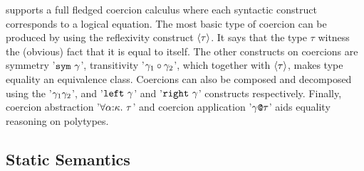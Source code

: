 \documentclass[manuscript,screen,nonacm]{acmart}
\begin{document}
\SFC supports a full fledged coercion calculus where each syntactic construct corresponds to a logical equation. The most basic type of coercion can be produced by using the reflexivity construct $\langle\tau\rangle$. It says that the type $\tau$ witness the (obvious) fact that it is equal to itself. The other constructs on coercions are symmetry '$\texttt{sym}~{\gamma}$', transitivity '$\gamma_1 \circ \gamma_2$', which together with $\langle\tau\rangle$, makes type equality an equivalence class. Coercions can also be composed and decomposed using the '$\gamma_1\gamma_2$', and '$\texttt{left}~\gamma$' and '$\texttt{right}~\gamma$' constructs respectively. Finally, coercion abstraction '$\forall\alpha{:}\kappa.~\tau$' and coercion application '$\gamma\texttt{@}\tau$' aids equality reasoning on polytypes.

\subsection{Static Semantics}

\newcommand\TCast{
  \ib{\irule[\trule{cast}]
    {\Typing \TEnv {\Tm} {\tau}}
    {\CoKinding \TEnv \gamma {\tau \sim \sigma}};
    {\Typing \TEnv {\Cast \Tm \gamma} {\sigma}}
  }
}

\newcommand\KReflCo{
  \ib{\irule[\trule{co-refl}]
    {\TyKinding \TEnv \tau \kappa};
    {\CoKinding \TEnv {\refl \tau} {\tau \sim \tau}}
  }
}

\newcommand\KSymCo{
  \ib{\irule[\trule{co-sym}]
    {\CoKinding \TEnv \gamma {\tau \sim \sigma}};
    {\CoKinding \TEnv {\sym \gamma} {\sigma \sim \tau}}
  }
}

\newcommand\KTransCo{
  \ib{\irule[\trule{co-trans}]
    {\CoKinding\TEnv {\gamma_1} {\tau \sim \tau_2}}
    {\CoKinding\TEnv {\gamma_2} {\tau_2 \sim \sigma}};
    {\CoKinding\TEnv {\trans {\gamma_1} \gamma_2} {\tau \sim \sigma}}
  }
}

\newcommand\KInstCo{
  \ib{\irule[\trule{co-$\E\forall$}]
    {\CoKinding\TEnv \gamma {\Forall\alpha\tau_1 \sim \Forall\beta\tau_2}}
    {\Subst_1 = \Sub\alpha\sigma}{\Subst_2 = \Sub\beta\sigma};
    {\CoKinding\TEnv {\gamma\At\sigma} {\Subst_1\tau_1 \sim \Subst_2\tau_2}}
  }
}

\newcommand\KForallCo{
  \ib{\irule[\trule{co-$\I\forall$}]
    {\CoKinding {\TEnv,\alpha\co\kappa} \gamma {\tau_1 \sim \tau_2}}{\alpha \# \TEnv};
    {\CoKinding \TEnv {\Forall {\alpha\co\kappa} \gamma} {\Forall {\alpha\co\kappa}\tau_1 \sim \Forall {\alpha\co\kappa}\tau_2}}
  }
}


\newcommand\KCoComp{
  \ib{\irule[\trule{co-comp}]
    {\CoKinding \TEnv {\gamma_1} {\tau_1 \sim \tau_2}}
    {\CoKinding \TEnv {\gamma_2} {\sigma_1 \sim \sigma_2}}
    {\TyKinding \TEnv {\tau_i\App \sigma_i} \kappa};
    {\CoKinding \TEnv {\gamma_1\App \gamma_2} {\tau_1 \sigma_1 \sim \tau_2 \sigma_2}}
  }
}
\end{document}

